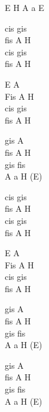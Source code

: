 \begin{chord}
E H A a E

cis gis\\
fis A H\\
cis gis\\
fis A H

E A\\
Fis A H\\
cis gis\\
fis A H

gis A\\
fis A H\\
gis fis\\
A a H (E)

cis gis\\
fis A H\\
cis gis\\
fis A H

E A\\
Fis A H\\
cis gis\\
fis A H

gis A\\
fis A H\\
gis fis\\
A a H (E)

gis A\\
fis A H\\
gis fis\\
A a H (E)
\end{chord}